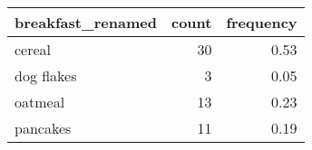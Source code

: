 \begin{table}[!h]
\centering
\begin{tabular}[t]{lrr}
\toprule
breakfast\_renamed & count & frequency\\
\midrule
cereal & 30 & 0.53\\
dog flakes & 3 & 0.05\\
oatmeal & 13 & 0.23\\
pancakes & 11 & 0.19\\
\bottomrule
\end{tabular}
\end{table}
